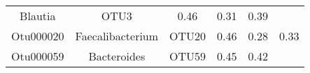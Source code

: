\documentclass[12pt,]{article}
\begin{document}
\begin{longtable}[]{@{}cccccc@{}}
\begin{minipage}[t]{0.17\columnwidth}
Blautia\strut
\end{minipage} & \begin{minipage}[t]{0.15\columnwidth}\centering\strut
OTU3\strut
\end{minipage} & \begin{minipage}[t]{0.22\columnwidth}\centering\strut
0.46\strut
\end{minipage} & \begin{minipage}[t]{0.17\columnwidth}\centering\strut
0.31\strut
\end{minipage} & \begin{minipage}[t]{0.04\columnwidth}\centering\strut
0.39\strut
\end{minipage}\tabularnewline
\begin{minipage}[t]{0.08\columnwidth}\centering\strut
Otu000020\strut
\end{minipage} & \begin{minipage}[t]{0.17\columnwidth}\centering\strut
Faecalibacterium\strut
\end{minipage} & \begin{minipage}[t]{0.15\columnwidth}\centering\strut
OTU20\strut
\end{minipage} & \begin{minipage}[t]{0.22\columnwidth}\centering\strut
0.46\strut
\end{minipage} & \begin{minipage}[t]{0.17\columnwidth}\centering\strut
0.28\strut
\end{minipage} & \begin{minipage}[t]{0.04\columnwidth}\centering\strut
0.33\strut
\end{minipage}\tabularnewline
\begin{minipage}[t]{0.08\columnwidth}\centering\strut
Otu000059\strut
\end{minipage} & \begin{minipage}[t]{0.17\columnwidth}\centering\strut
Bacteroides\strut
\end{minipage} & \begin{minipage}[t]{0.15\columnwidth}\centering\strut
OTU59\strut
\end{minipage} & \begin{minipage}[t]{0.22\columnwidth}\centering\strut
0.45\strut
\end{minipage} & \begin{minipage}[t]{0.17\columnwidth}\centering\strut
0.42\strut
\end{minipage} & \begin{minipage}[t]{0.04\columnwidth}\centering\strut

\end{minipage}
\end{longtable}
\end{document}
